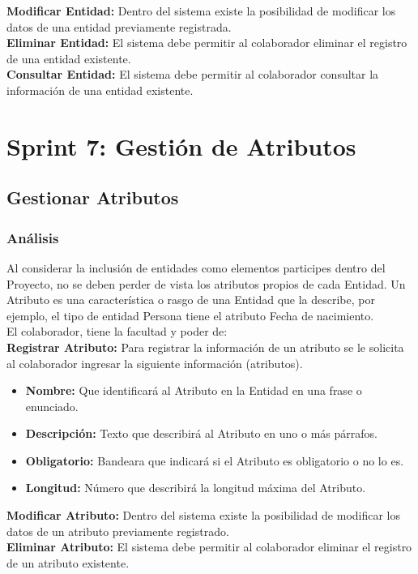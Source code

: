 \textbf {Modificar Entidad:}
Dentro del sistema existe la posibilidad de modificar los datos de una entidad previamente registrada.\\

\textbf {Eliminar Entidad:} 
El sistema debe permitir al colaborador eliminar el registro de una entidad existente.\\

\textbf {Consultar Entidad:} 
El sistema debe permitir al colaborador consultar la información de una entidad existente.


\section{Sprint 7: Gestión de Atributos}
\subsection{Gestionar Atributos}

\subsubsection {Análisis}
Al considerar la inclusión de entidades como elementos participes dentro del Proyecto, no se deben perder de vista los atributos propios de cada Entidad. Un Atributo es una característica o rasgo de una Entidad que la describe, por ejemplo, el tipo de entidad Persona tiene el atributo Fecha de nacimiento. \\

El colaborador, tiene la facultad y poder de:\\

\textbf {Registrar Atributo:}
Para registrar la información de un atributo se le solicita al colaborador ingresar la siguiente información (atributos).
\begin{itemize}
	\item \textbf{Nombre:} Que identificará al Atributo en la Entidad en una frase o enunciado.
	\item \textbf{Descripción:} Texto que describirá al Atributo  en uno o más párrafos.
	\item \textbf{Obligatorio:} Bandeara que indicará si el Atributo es obligatorio o no lo es.
	\item \textbf{Longitud:} Número que describirá la longitud máxima del Atributo.
\end{itemize}

\textbf {Modificar Atributo:}
Dentro del sistema existe la posibilidad de modificar los datos de un atributo previamente registrado.\\

\textbf {Eliminar Atributo:} 
El sistema debe permitir al colaborador eliminar el registro de un atributo existente.\\


